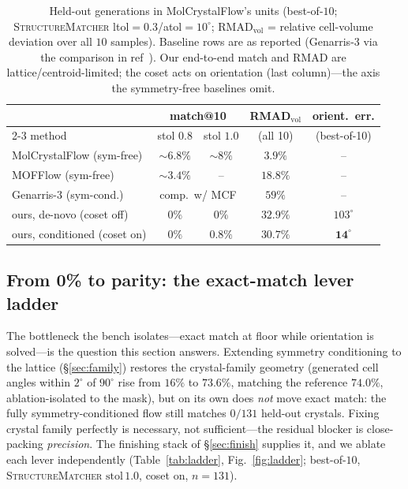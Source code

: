 \documentclass[journal=jcisd8,manuscript=article]{achemso}
\begin{document}
\begin{table}[t]\centering
\caption{Held-out generations in MolCrystalFlow's units (best-of-$10$;
\textsc{StructureMatcher} ltol$=0.3$/atol$=10^\circ$; RMAD$_{\mathrm{vol}}$ =
relative cell-volume deviation over all $10$ samples). Baseline rows are as
reported\cite{zeng2026molcrystalflow,kim2025mofflow} (Genarris-3 via the comparison
in ref~). Our end-to-end match and RMAD are
lattice/centroid-limited; the coset acts on orientation (last column)---the axis
the symmetry-free baselines omit.}
\label{tab:bench}
\begin{tabular}{lcccc}\toprule
 & \multicolumn{2}{c}{match@10} & RMAD$_{\mathrm{vol}}$ & orient.\ err. \\
\cmidrule(lr){2-3}
method & stol $0.8$ & stol $1.0$ & (all 10) & (best-of-10) \\\midrule
MolCrystalFlow (sym-free)\cite{zeng2026molcrystalflow} & $\sim\!6.8\%$ & $\sim\!8\%$ & $3.9\%$ & -- \\
MOFFlow (sym-free)\cite{kim2025mofflow}                & $\sim\!3.4\%$ & --          & $18.8\%$ & -- \\
Genarris-3 (sym-cond.)                                 & \multicolumn{2}{c}{comp.\ w/ MCF} & $59\%$ & -- \\\midrule
ours, de-novo (coset off)                              & $0\%$ & $0\%$   & $32.9\%$ & $103^\circ$ \\
ours, conditioned (coset on)                           & $0\%$ & $0.8\%$ & $30.7\%$ & $\mathbf{14^\circ}$ \\\bottomrule
\end{tabular}
\end{table}

\subsection{From 0\% to parity: the exact-match lever ladder}\label{sec:ladder}
The bottleneck the bench isolates---exact match at floor while orientation is
solved---is the question this section answers. Extending symmetry conditioning to
the lattice (\S\ref{sec:family}) restores the crystal-family geometry (generated
cell angles within $2^\circ$ of $90^\circ$ rise from $16\%$ to $73.6\%$, matching
the reference $74.0\%$, ablation-isolated to the mask), but on its own does
\emph{not} move exact match: the fully symmetry-conditioned flow still matches
$0/131$ held-out crystals. Fixing crystal family perfectly is necessary, not
sufficient---the residual blocker is close-packing \emph{precision}. The finishing
stack of \S\ref{sec:finish} supplies it, and we ablate each lever independently
(Table~\ref{tab:ladder}, Fig.~\ref{fig:ladder}; best-of-$10$,
\textsc{StructureMatcher} $\text{stol}\,1.0$, coset on, $n{=}131$).
\end{document}
